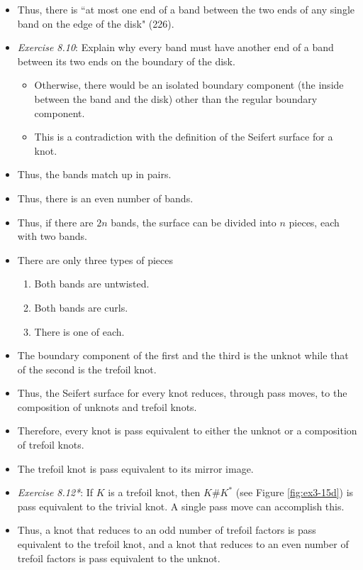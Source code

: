 \documentclass[titlepage]{article}
\numberwithin{figure}{section}
\numberwithin{table}{section}
\numberwithin{equation}{section}
\newcommand{\dq}[2]{``#1" (#2).}
\begin{document}
\begin{itemize}
\begin{itemize}
        \item Thus, there is \dq{at most one end of a band between the two ends of any single band on the edge of the disk}{226}
        \item \emph{Exercise 8.10}: Explain why every band must have another end of a band between its two ends on the boundary of the disk.
        \begin{itemize}
            \item Otherwise, there would be an isolated boundary component (the inside between the band and the disk) other than the regular boundary component.
            \item This is a contradiction with the definition of the Seifert surface for a knot.
        \end{itemize}
        \item Thus, the bands match up in pairs.
        \item Thus, there is an even number of bands.
        \item Thus, if there are $2n$ bands, the surface can be divided into $n$ pieces, each with two bands.
        \item There are only three types of pieces
        \begin{enumerate}
            \item Both bands are untwisted.
            \item Both bands are curls.
            \item There is one of each.
        \end{enumerate}
        \item The boundary component of the first and the third is the unknot while that of the second is the trefoil knot.
        \item Thus, the Seifert surface for every knot reduces, through pass moves, to the composition of unknots and trefoil knots.
        \item Therefore, every knot is pass equivalent to either the unknot or a composition of trefoil knots.
        \item The trefoil knot is pass equivalent to its mirror image.
        \item \emph{Exercise 8.12*}: If $K$ is a trefoil knot, then $K\#K^*$ (see Figure \ref{fig:ex3-15d}) is pass equivalent to the trivial knot. A single pass move can accomplish this.
        \item Thus, a knot that reduces to an odd number of trefoil factors is pass equivalent to the trefoil knot, and a knot that reduces to an even number of trefoil factors is pass equivalent to the unknot.

\end{itemize}
\end{itemize}
\end{document}
